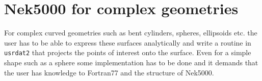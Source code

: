 


\section{Nek5000 for complex geometries}
For complex curved geometries such as bent cylinders, spheres, ellipsoids etc.
the user has to be able to express these surfaces analytically and write a routine
in \verb|usrdat2| that projects the points of interest onto the surface.
Even for a simple shape such as a sphere some implementation has to be done and it 
demands that the user has knowledge to Fortran77 and the structure of Nek5000.

